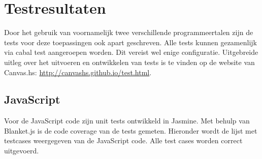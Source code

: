 \section{Testresultaten} \label{sec:testresultaten}


Door het gebruik van voornamelijk twee verschillende programmeertalen zijn de tests voor deze toepassingen ook apart geschreven. Alle tests kunnen gezamenlijk via cabal test aangeroepen worden. Dit vereist wel enige configuratie. Uitgebreide uitleg over het uitvoeren en ontwikkelen van tests is te vinden op de website van Canvas.hs: \url{http://canvashs.github.io/test.html}.

\subsection{JavaScript}
Voor de JavaScript code zijn unit tests ontwikkeld in Jasmine. Met behulp van Blanket.js is de code coverage van de tests gemeten. Hieronder wordt de lijst met testcases weergegeven van de JavaScript code. Alle test cases worden correct uitgevoerd.

